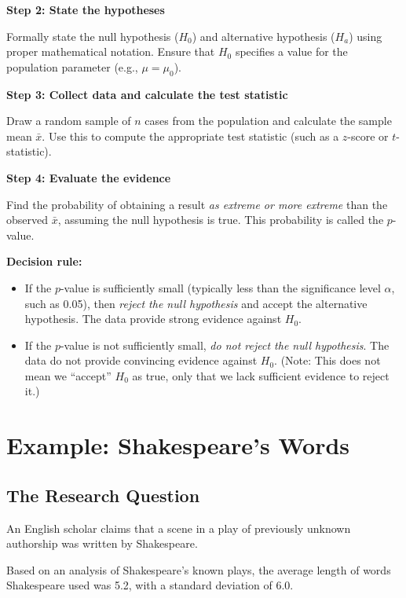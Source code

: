 \documentclass[
  letterpaper,
  DIV=11,
  numbers=noendperiod]{scrreprt}
\begin{document}
\textbf{Step 2: State the hypotheses}

Formally state the null hypothesis (\(H_0\)) and alternative hypothesis
(\(H_a\)) using proper mathematical notation. Ensure that \(H_0\)
specifies a value for the population parameter (e.g., \(\mu = \mu_0\)).

\textbf{Step 3: Collect data and calculate the test statistic}

Draw a random sample of \(n\) cases from the population and calculate
the sample mean \(\bar{x}\). Use this to compute the appropriate test
statistic (such as a \(z\)-score or \(t\)-statistic).

\textbf{Step 4: Evaluate the evidence}

Find the probability of obtaining a result \emph{as extreme or more
extreme} than the observed \(\bar{x}\), assuming the null hypothesis is
true. This probability is called the \(p\)-value.

\textbf{Decision rule:}

\begin{itemize}
\item
  If the \(p\)-value is sufficiently small (typically less than the
  significance level \(\alpha\), such as 0.05), then \emph{reject the
  null hypothesis} and accept the alternative hypothesis. The data
  provide strong evidence against \(H_0\).
\item
  If the \(p\)-value is not sufficiently small, \emph{do not reject the
  null hypothesis}. The data do not provide convincing evidence against
  \(H_0\). (Note: This does not mean we ``accept'' \(H_0\) as true, only
  that we lack sufficient evidence to reject it.)
\end{itemize}

\section{Example: Shakespeare's Words}\label{example-shakespeares-words}

\subsection{The Research Question}\label{the-research-question}

An English scholar claims that a scene in a play of previously unknown
authorship was written by Shakespeare.

Based on an analysis of Shakespeare's known plays, the average length of
words Shakespeare used was 5.2, with a standard deviation of 6.0.
\end{document}
